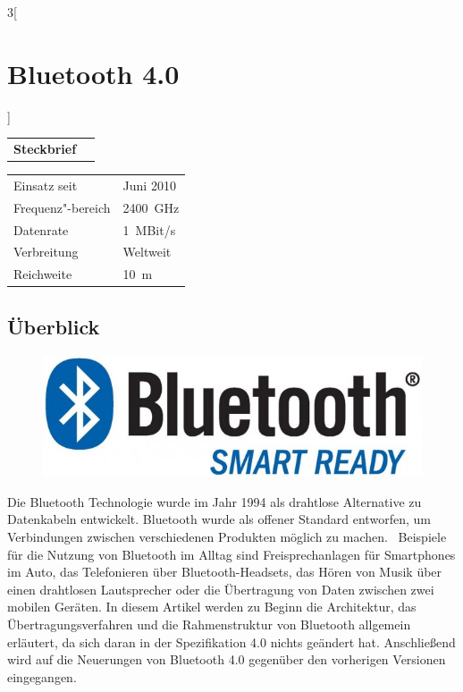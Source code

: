 \begin{multicols}{3}[\section{Bluetooth 4.0}]


\newrefsegment

\begin{tabular}{p{}p{2.7 cm}}
\textbf{Steckbrief}& \\
\end{tabular}
\begin{tabular}{p{}p{2.7 cm}}
      Einsatz seit & Juni 2010\\
      Frequenz"-bereich  & \SI{2400}{\giga\hertz}\\
      Datenrate & \SI{1}{MBit/s}\\
      Verbreitung & Weltweit\\
      Reichweite & \SI{10}{\metre}\\
\end{tabular}
\par

\subsection*{Überblick}
\begin{figure}
  \vspace{-20pt}
  \begin{center}
  	\hspace{-20pt}
    \includegraphics[width=0.7\linewidth]{Kapitel/Bluetooth_4/Grafiken/logo.jpg}
  \end{center}
  \vspace{-15pt}
\end{figure}
Die Bluetooth Technologie wurde im Jahr 1994 als drahtlose Alternative zu Datenkabeln entwickelt. Bluetooth wurde als offener Standard entworfen, um Verbindungen zwischen verschiedenen Produkten möglich zu machen.~\cite{Bluetooth_4.1} Beispiele für die Nutzung von Bluetooth im Alltag sind Freisprechanlagen für Smartphones im Auto, das Telefonieren über Bluetooth-Headsets, das Hören von Musik über einen drahtlosen Lautsprecher oder die Übertragung von Daten zwischen zwei mobilen Geräten. In diesem Artikel werden zu Beginn die Architektur, das Übertragungsverfahren und die Rahmenstruktur von Bluetooth allgemein erläutert, da sich daran in der Spezifikation 4.0 nichts geändert hat. Anschließend wird auf die Neuerungen von Bluetooth 4.0 gegenüber den vorherigen Versionen eingegangen.


\end{multicols}
